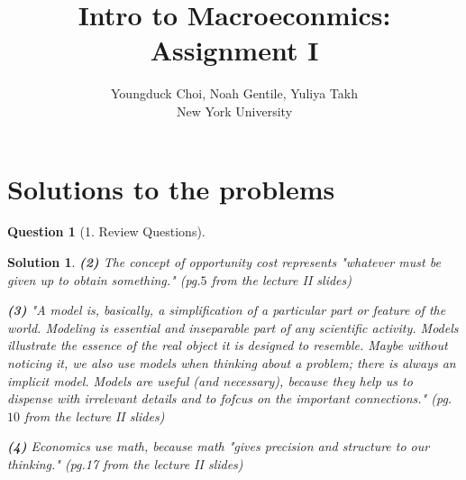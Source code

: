 \documentclass{article} %
\title{Intro to Macroeconmics: Assignment I}
\author{
Youngduck Choi, Noah Gentile, Yuliya Takh \\
New York University \\
}
\theoremstyle{quest}
\newtheorem*{question}{Question}
\newtheorem*{solution}{Solution}
\begin{document}
\maketitle

\begin{abstract}
\end{abstract}

\section{Solutions to the problems}

\begin{question}[1. Review Questions]
\end{question}
\begin{solution}
\textbf{(2)} The concept of opportunity cost represents "whatever must be given up
to obtain something." (pg.$5$ from the lecture II slides)

\smallskip

\textbf{(3)}
"A model is, basically, a simplification of a particular part or feature of the world. 
Modeling is essential and inseparable part of any scientific activity. Models illustrate
the essence of the real object it is designed to resemble. Maybe without noticing it, we also
use models when thinking about a problem; there is always an implicit model. Models are 
useful (and necessary), because they help us to dispense with irrelevant details 
and to fofcus on the important connections." (pg.$10$ from the lecture II slides) 

\smallskip

\textbf{(4)}
Economics use math, because math "gives precision and structure to our thinking." (pg.17 
from the lecture II slides)
\end{solution}

\bigskip
\end{document}
